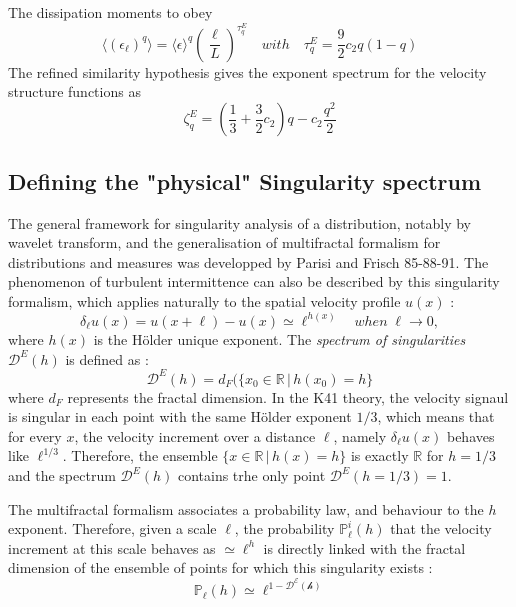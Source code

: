 The dissipation moments to obey
\begin{equation}
    \langle(\epsilon_\ell)^q\rangle=\langle\epsilon\rangle^q\left(\frac{\ell}{L}\right)^{\tau_q^E}\quad with\quad \tau_q^E=\frac{9}{2}c_2q(1-q)
\end{equation}
The refined similarity hypothesis gives the exponent spectrum for the velocity structure functions as
\begin{equation}
    \zeta_q^E=\left(\frac{1}{3}+\frac{3}{2}c_2\right)q-c_2\frac{q^2}{2}
\end{equation}

\subsection{Defining the "physical" Singularity spectrum}

The general framework for singularity analysis of a distribution, notably by wavelet transform, and the generalisation of multifractal formalism for distributions and measures was developped by Parisi and Frisch 85-88-91. The phenomenon of turbulent intermittence can also be described by this singularity formalism, which applies naturally to the spatial velocity profile $u(x)$ :
\begin{equation}
    \delta_\ell u(x)=u(x+\ell)-u(x)\simeq\ell^{h(x)}\quad when\;\ell\rightarrow0,
\end{equation}
where $h(x)$ is the Hölder unique exponent.
The \emph{spectrum of singularities} $\mathcal{D}^E(h)$ is defined as :
\begin{equation}
    \mathcal{D}^E(h)=d_F(\{x_0\in\mathbb{R}\,|\,h(x_0)=h\}
\end{equation}
where $d_F$ represents the fractal dimension. In the K41 theory, the velocity signaul is singular in each point with the same Hölder exponent $1/3$, which means that for every $x$, the velocity increment over a distance $\ell$, namely $\delta_\ell u(x)$ behaves like $\ell^{1/3}$.
Therefore, the ensemble $\{x\in\mathbb{R}\,|\,h(x)=h\}$ is exactly $\mathbb{R}$ for $h=1/3$ and the spectrum $\mathcal{D}^E(h)$ contains trhe only point $\mathcal{D}^E(h=1/3)=1$.

The multifractal formalism associates a probability law, and behaviour to the $h$ exponent. Therefore, given a scale $\ell$, the probability $\mathbb{P}_\ell^i(h)$ that the velocity increment at this scale behaves as $\simeq\ell^h$ is directly linked with the fractal dimension of the ensemble of points for which this singularity exists :
\begin{equation}
    \mathbb{P}_\ell(h)\simeq\ell^{1-\mathcal{D^E(h)}}
\end{equation}

